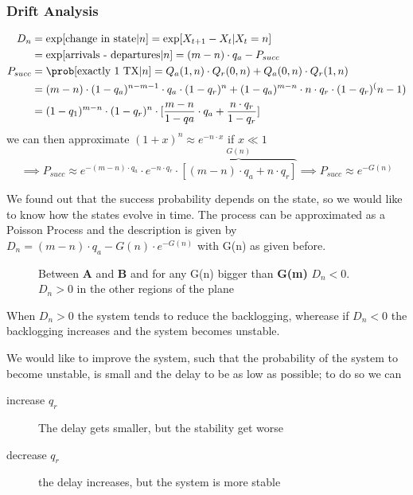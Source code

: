 \subsubsection{Drift Analysis}
\begin{equation}\begin{split}
  D_n &= \exp[\text{change in state} | n] = \exp[X_{t+1} - X_t | X_t = n] \\
  &= \exp[\text{arrivals - departures} | n ] = (m-n) \cdot q_a - P_{succ} \\
  P_{succ}&= \prob[\text{exactly 1 TX}|n] = Q_a(1,n) \cdot Q_r(0,n) + Q_a(0,n) \cdot Q_r(1,n) \\
  &= (m-n)\cdot(1-q_a)^{n-m-1} \cdot q_a \cdot(1-q_r)^n + (1-q_a)^{m-n}\cdot n \cdot q_r \cdot (1-q_r)^(n-1) \\
  &= (1-q_1)^{m-n} \cdot (1-q_r)^n \cdot [\frac{m-n}{1-qa}\cdot q_a + \frac{n \cdot q_r}{1-q_r}]
\end{split}\end{equation}
we can then approximate $(1+x)^n \approx e^{-n \cdot x}$ if $x \ll 1$
\begin{equation}
  \implies P_{succ} \approx e^{-(m-n)\cdot q_a} \cdot e^{-n\cdot q_r} \cdot \overbrace{[(m-n) \cdot q_a + n \cdot q_r]}^{G(n)}
  \implies P_{succ} \approx e^{-G(n)}
\end{equation}

We found out that the success probability depends on the state, so we would like to know how the states evolve in time.
The process can be approximated as a Poisson Process and the description is given by $D_n = (m-n)\cdot q_a - G(n) \cdot e^{-G(n)}$
with G(n) as given before.

\begin{figure}
  
  \caption{Between \textbf{A} and \textbf{B} and for any G(n) bigger than \textbf{G(m)} $D_n <0$. $D_n>0$ in the other regions of the plane}
  \label{fig:drift}
\end{figure}


When $D_n>0$ the system tends to reduce the backlogging, wherease if $D_n<0$ the backlogging
increases and the system becomes unstable.

We would like to improve the system, such that the probability of the system to become
unstable, is small and the delay to be as low as possible; to do so we can

\begin{description}
  \item[increase $q_r$] The delay gets smaller, but the stability get worse
  \item[decrease $q_r$] the delay increases, but the system is more stable
\end{description}

